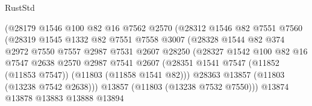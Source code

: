 \begin{lexlean}{RustStd}
\begin{coremodule}
                                (@28179
                                  @1546
                                  @100
                                  @82
                                  @16
                                  @7562
                                  @2570
                                  (@28312
                                    @1546
                                    @82
                                    @7551
                                    @7560
                                    (@28319
                                      @1545
                                      @1332
                                      @82
                                      @7551
                                      @7558
                                      @3007
                                      (@28328
                                        @1544
                                        @82
                                        @374
                                        @2972
                                        @7550
                                        @7557
                                        @2987
                                        @7531
                                        @2607
                                        @28250
                                        (@28327
                                          @1542
                                          @100
                                          @82
                                          @16
                                          @7547
                                          @2638
                                          @2570
                                          @2987
                                          @7541
                                          @2607
                                          (@28351
                                            @1541
                                            @7547
                                            (@11852 (@11853 @7547))
                                            (@11803 (@11858 @1541 @82)))
                                          @28363
                                          @13857
                                          (@11803 (@13238 @7542 @2638)))
                                        @13857
                                        (@11803 (@13238 @7532 @7550)))
                                      @13874
                                      @13878
                                      @13883
                                      @13888
                                      @13894

\end{coremodule}
\end{lexlean}
